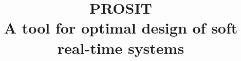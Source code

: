 \documentclass[11pt,a4paper,twoside,openright]{book}
\begin{document}
\title{PROSIT \\A tool for optimal design of soft real-time systems}
\providecommand{\autore}{Gianluca Bortoli}
\providecommand{\principaladviser}{Prof. Luigi Palopoli}
\providecommand{\annoacc}{2014-2015}

\titlep

\frontmatter
{}

\tableofcontents

\clearpage
\pagestyle{headings}
\renewcommand{\chaptermark}[1]{\markboth{{\chaptername}\ \thechapter.\hspace{1em}#1}{}}

\mainmatter







\renewcommand{\chaptermark}[1]{\markboth{{\appendixname}\ \thechapter.\hspace{1em}#1}{}}

%



\end{document}
